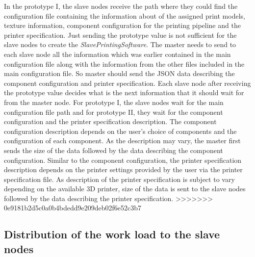 In the prototype I, the slave nodes receive the path where they could find the configuration file containing the information about of the assigned print models, texture information, component configuration for the printing pipeline and the printer specification. Just sending the prototype value is not sufficient for the slave nodes to create the \textit{SlavePrintingSoftware}. The master needs to send to each slave node all the information which was earlier contained in the main configuration file along with the information from the other files included in the main configuration file. So master should send the JSON data describing the component configuration and printer specification. Each slave node after receiving the prototype value decides what is the next information that it should wait for from the master node. For prototype I, the slave nodes wait for the main configuration file path and for prototype II, they wait for the component configuration and the printer specification description. The component configuration description depends on the user's choice of components and the configuration of each component. As the description may vary, the master first sends the size of the data followed by the data describing the component configuration. Similar to the component configuration, the printer specification description depends on the printer settings provided by the user via the printer specification file. As description of the printer specification is subject to vary depending on the available 3D printer, size of the data is sent to the slave nodes followed by the data describing the printer specification.    
>>>>>>> 0e9181b2d5c0a0b4bdedd9e209deb02f6e52c3b7

\subsection{Distribution of the work load to the slave nodes}

